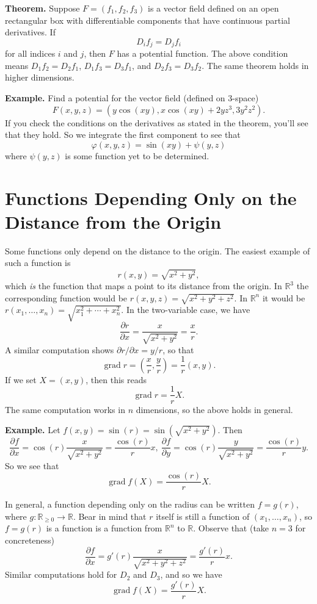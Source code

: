 \documentclass{article}
\DeclareMathOperator{\grd}{grad}
\begin{document}
\textbf{Theorem.}
Suppose $F = (f_1, f_2, f_3)$ is a vector field defined on an open rectangular box with differentiable components that have
continuous partial derivatives. If 
\[D_i f_j = D_j f_i\]
for all indices $i$ and $j$, then $F$ has a potential function.
The above condition means $D_1 f_2 = D_2 f_1$, $D_1 f_3 = D_3 f_1$, and $D_2 f_3 = D_3 f_2$.
The same theorem holds in higher dimensions.

\textbf{Example.} Find a potential for the vector field (defined on 3-space)
\[ F(x,y,z) = (y\cos(xy), x\cos(xy) + 2yz^3, 3y^2z^2).\]
If you check the conditions on the derivatives as stated in the theorem,
you'll see that they hold. So we integrate the first component to see that 
\[\varphi(x,y,z) = \sin(xy) + \psi(y,z)\]
where $\psi(y,z)$ is some function yet to be determined.

\section*{Functions Depending Only on the Distance from the Origin}

Some functions only depend on the distance to the origin. The easiest example of such a function is
\[r(x,y)=\sqrt{x^2+y^2},\]
which \emph{is} the function that maps a point to its distance from the origin. In $\mathbb{R}^3$ the corresponding
function would be $r(x,y,z) = \sqrt{x^2+y^2+z^2}$. In $\mathbb{R}^n$ it would be
$r(x_1,\ldots,x_n) = \sqrt{x_1^2 + \cdots + x_n^2}$. In the two-variable case, we have
\[  \frac{\partial r}{\partial x} = \frac{x}{\sqrt{x^2+y^2}} = \frac{x}{r}.\]
A similar computation shows $\partial r/\partial x = y/r$, so that 
\[ \grd r = \left( \frac{x}{r} , \frac{y}{r}\right) = \frac{1}{r} (x,y).\]
If we set $X = (x,y)$, then this reads
\[ \grd r = \frac{1}{r} X.\]
The same computation works in $n$ dimensions, so the above holds in general.

\textbf{Example.} Let $f(x,y) = \sin(r) = \sin(\sqrt{x^2+y^2})$. Then 
\[\frac{\partial f}{\partial x} = \cos(r) \frac{x}{\sqrt{x^2+y^2}}=\frac{\cos(r)}{r} x,\ \frac{\partial f}{\partial y} = \cos(r) \frac{y}{\sqrt{x^2+y^2}} = \frac{\cos(r)}{r}y.\]
So we see that
\[\grd f(X) = \frac{\cos(r)}{r} X.\]

In general, a function depending only on the radius can be written $f=g(r)$, where $g: \mathbb{R}_{\geq 0} \to \mathbb{R}$.
Bear in mind that $r$ itself is still a function of $(x_1, \ldots, x_n)$, so $f=g(r)$ is a function is a function
from $\mathbb{R}^n$ to $\mathbb{R}$. Observe that (take $n=3$ for concreteness)
\[ \frac{\partial f}{\partial x} = g'(r) \frac{x}{\sqrt{x^2+y^2+z^2}} = \frac{g'(r)}{r} x.\]
Similar computations hold for $D_2$ and $D_3$, and so we have
\[ \grd f(X) = \frac{g'(r)}{r} X.\]
\end{document}
